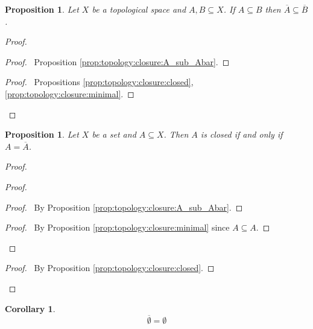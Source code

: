 \documentclass{report}
\let\qed\relax
\newtheorem{prop}[lm]{Proposition}
\newtheorem{cor}{Corollary}[lm]
\theoremstyle{definition}
\begin{document}
  \begin{prop}
    \label{prop:topology:closure:monotone}
    Let $X$ be a topological space and $A, B \subseteq X$. If $A \subseteq B$
    then $\overline{A} \subseteq \overline{B}$.
  \end{prop}

  \begin{proof}
    \pf
    \begin{proof}
      \pf\ Proposition \ref{prop:topology:closure:A_sub_Abar}.
    \end{proof}
    \begin{proof}
      \pf\ Propositions \ref{prop:topology:closure:closed},
      \ref{prop:topology:closure:minimal}.
    \end{proof}
    \qed
  \end{proof}

  \begin{prop}
    \label{prop:topology:closure:closed2}
    Let $X$ be a set and $A \subseteq X$. Then $A$ is closed if and only if $A
    = \overline{A}$.
  \end{prop}

  \begin{proof}
    \pf
    \begin{proof}
      \begin{proof}
        \pf\ By Proposition \ref{prop:topology:closure:A_sub_Abar}.
      \end{proof}
      \begin{proof}
        \pf\ By Proposition \ref{prop:topology:closure:minimal} since $A
        \subseteq A$.
      \end{proof}
    \end{proof}
    \begin{proof}
      \pf\ By Proposition \ref{prop:topology:closure:closed}.
    \end{proof}
    \qed
  \end{proof}

  \begin{cor}
    \[ \overline{\emptyset} = \emptyset \]
  \end{cor}
\end{document}

